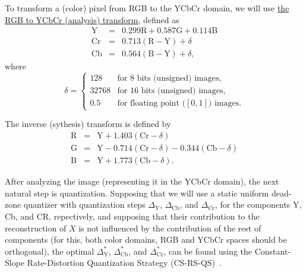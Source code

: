To transform a (color) pixel from RGB to the YCbCr domain, we will use
\href{https://docs.opencv.org/3.4/de/d25/imgproc_color_conversions.html}{the
  RGB to YCbCr (analysis) transform}, defined as
\begin{equation}
  \begin{array}{lcl}
    \text{Y}  & = & 0.299\text{R} + 0.587\text{G} + 0.114\text{B} \\
    \text{Cr} & = & 0.713(\text{R} - \text{Y}) + \delta  \\
    \text{Cb} & = & 0.564(\text{B} - \text{Y}) + \delta,
  \end{array}
  \label{eq:analysis}
\end{equation}
where
\begin{equation}
  \delta = \left\{
  \begin{array}{ll}
    128 & \text{for 8 bits (unsigned) images},\\
    32768 & \text{for 16 bits (unsigned) images},\\
    0.5 & \text{for floating point (}[0,1]\text{) images}.
  \end{array}
  \right.
\end{equation}

The inverse (sythesis) transform is defined by
\begin{equation}
  \begin{array}{lcl}
    \text{R} & = & \text{Y} + 1.403(\text{Cr} - \delta) \\
    \text{G} & = & \text{Y} - 0.714(\text{Cr} - \delta) - 0.344(\text{Cb} - \delta)\\
    \text{B} & = & \text{Y} + 1.773(\text{Cb} - \delta).
  \end{array}
  \label{eq:synthesis}
\end{equation}

After analyzing the image (representing it in the YCbCr domain), the
next natural step is quantization. Supposing that we will use a static
uniform dead-zone quantizer with quantization steps
$\Delta_{\text{Y}}$, $\Delta_{\text{Cb}}$, and $\Delta_{\text{Cr}}$,
for the components Y, Cb, and CR, repectively, and supposing that
their contribution to the reconstruction of $X$ is not influenced by
the contribution of the rest of components (for this, both color
domains, RGB and YCbCr spaces should be orthogonal), the optimal
$\Delta^*_{\text{Y}}$, $\Delta^*_{\text{Cb}}$, and
$\Delta^*_{\text{Cr}}$, can be found using the Constant-Slope
Rate-Distortion Quantization Strategy
(CS-RS-QS)~\cite{vetterli1995wavelets,sayood2017introduction}.

